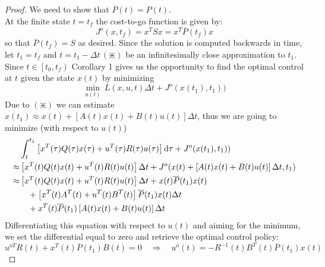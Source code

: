 \documentclass[paper=a4, pagesize, DIV=calc, BCOR=12.5mm, twoside=on, onecolumn=on, open = any, titlepage =on, parskip =half-, headsepline = on, footsepline = on, chapterprefix = on, appendixprefix = off, fontsize = 12pt, numbers = noenddot, abstract = on]{scrbook}
\numberwithin{equation}{chapter}
\theoremstyle{definition}
\theoremstyle{plain}
\theoremstyle{plain}
\theoremstyle{remark}
\theoremstyle{plain}
\theoremstyle{plain}
\begin{document}
\begin{proof}
We need to show that $\overline{P}(t) =P(t)$.\\
At the finite state $t=t_f$ the cost-to-go function is given by:
\[
J^o(x, t_f) = x^TSx = x^T \overline{P}(t_f)x
\]so that $\overline{P} (t_f) = S$ as desired.
Since the solution is computed backwards in time, let $t_1 = t_f$ and $t = t_1 - \Delta t \, (\divideontimes)$ be an infinitesimally close approximation to $t_1$. Since $t \in \left[ t_0, t_f \right)$ Corollary 1 gives us the opportunity to find the optimal control at $t$ given the state $x(t)$ by minimizing \[ \min_{u(t)}\, L(x,u,t)\Delta t + J^o(x(t_1),t_1))\]
Due to $(\divideontimes)$ we can estimate $x(t_1) \approx x(t) + \left[A(t)x(t) + B(t)u(t)\right] \Delta t$, thus we are going to minimize (with respect to $u(t)$)
\begin{align*}
& \int_t^{t_1} \left[ x^T(\tau)Q(\tau)x(\tau) + u^T(\tau)R(\tau)u(\tau)\right] \mathop{}\!\mathrm{d}\tau + J^o(x(t_1),t_1))\\
\approx & \left[ x^T(t)Q(t)x(t) + u^T(t)R(t)u(t) \right] \Delta t + J^o( x(t) + \left[A(t)x(t) + B(t)u(t)\right] \Delta t, t_1)\\
\approx & \left[ x^T(t)Q(t)x(t) + u^T(t)R(t)u(t) \right] \Delta t + x(t)\overline{P}(t_1)x(t)\\
& \quad + \left[ x^T(t)A^T(t) + u^T(t)B^T(t) \right] \overline{P}(t_1)x(t)\Delta t\\
& \quad + x^T(t)\overline{P}(t_1)\left[ A(t)x(t) + B(t)u(t) \right] \Delta t
\end{align*}
Differentiating this equation with respect to $u(t)$ and aiming for the minimum, we set the differential equal to zero and retrieve the optimal control policy:
\begin{equation*}
u^{oT}R(t) + x^T(t)\overline{P}(t_1)B(t) = 0\quad
\Rightarrow \quad u^o(t) = -R^{-1}(t)B^T(t)\overline{P}(t_1)x(t)
\end{equation*}


\end{proof}
\end{document}
